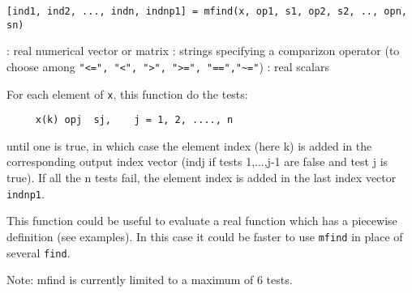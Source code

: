 
\begin{mandesc}
\end{mandesc}

\begin{calling_sequence}
\begin{verbatim}
[ind1, ind2, ..., indn, indnp1] = mfind(x, op1, s1, op2, s2, .., opn, sn)
\end{verbatim}
\end{calling_sequence}
\begin{parameters}
  \begin{varlist}
    :  real numerical vector or matrix
    : strings specifying a comparizon operator (to choose among \verb+"<=", "<", ">", ">=", "==","~="+)
    :  real scalars
  \end{varlist}
\end{parameters}

\begin{mandescription}
For each element of \verb+x+, this function do the tests:
\begin{verbatim}
     x(k) opj  sj,    j = 1, 2, ...., n
\end{verbatim}
until one is true, in which case the element index (here k) is added in the
corresponding output index vector (indj if tests 1,...,j-1 are false and test j is true).
If all the n tests fail, the element index is added in the last index vector \verb+indnp1+.

This function could be useful to evaluate a real function which has a piecewise definition
(see examples). In this case it could be faster to use \verb+mfind+ in place of several \verb+find+.

Note: mfind is currently limited to a maximum of 6 tests.
\end{mandescription}

